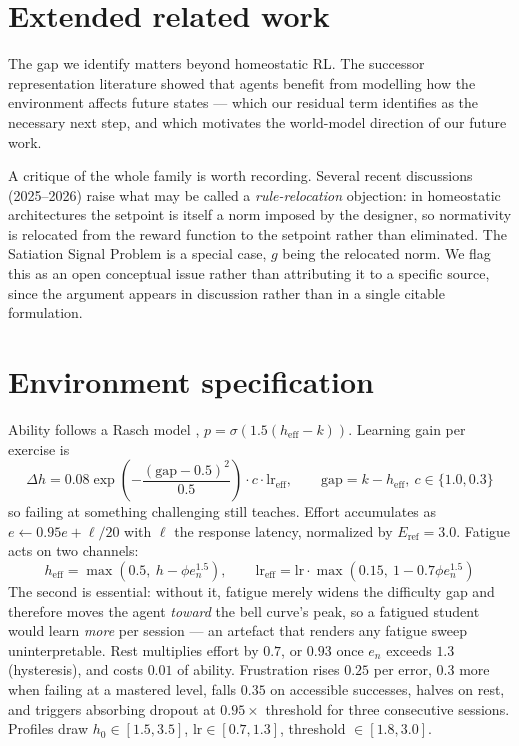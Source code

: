 \documentclass{article}
\begin{document}
\section{Extended related work}
\label{app:related}

The gap we identify matters beyond homeostatic RL. The successor representation literature \cite{Dayan1993,GershmanEtAl2012,LehnertLittman2019} showed that agents benefit from modelling how the environment affects future states --- which our residual term identifies as the necessary next step, and which motivates the world-model direction of our future work.

A critique of the whole family is worth recording. Several recent discussions (2025--2026) raise what may be called a \emph{rule-relocation} objection: in homeostatic architectures the setpoint is itself a norm imposed by the designer, so normativity is relocated from the reward function to the setpoint rather than eliminated. The Satiation Signal Problem is a special case, $g$ being the relocated norm. We flag this as an open conceptual issue rather than attributing it to a specific source, since the argument appears in discussion rather than in a single citable formulation.


\section{Environment specification}
\label{app:env}
Ability follows a Rasch model \cite{Rasch1960}, $p=\sigma(1.5(h_{\text{eff}}-k))$. Learning gain per exercise is
\[\Delta h = 0.08\exp\!\left(-\frac{(\text{gap}-0.5)^2}{0.5}\right)\cdot c \cdot \text{lr}_{\text{eff}},\qquad \text{gap}=k-h_{\text{eff}},\ c\in\{1.0,0.3\}\]
so failing at something challenging still teaches. Effort accumulates as $e \leftarrow 0.95e+\ell/20$ with $\ell$ the response latency, normalized by $E_{\text{ref}}{=}3.0$. Fatigue acts on two channels:
\[h_{\text{eff}}=\max(0.5,\ h-\phi e_n^{1.5}),\qquad \text{lr}_{\text{eff}}=\text{lr}\cdot\max(0.15,\ 1-0.7\phi e_n^{1.5})\]
The second is essential: without it, fatigue merely widens the difficulty gap and therefore moves the agent \emph{toward} the bell curve's peak, so a fatigued student would learn \emph{more} per session --- an artefact that renders any fatigue sweep uninterpretable. Rest multiplies effort by $0.7$, or $0.93$ once $e_n$ exceeds $1.3$ (hysteresis), and costs $0.01$ of ability. Frustration rises $0.25$ per error, $0.3$ more when failing at a mastered level, falls $0.35$ on accessible successes, halves on rest, and triggers absorbing dropout at $0.95\times$ threshold for three consecutive sessions. Profiles draw $h_0\in[1.5,3.5]$, $\text{lr}\in[0.7,1.3]$, threshold $\in[1.8,3.0]$.
\end{document}
